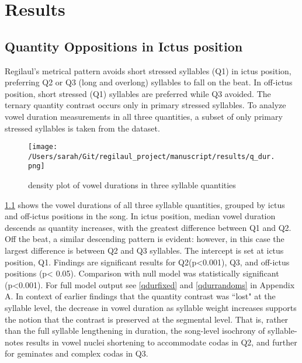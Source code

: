 \chapter{Results}
%

\section{Quantity Oppositions in Ictus position}

Regilaul's metrical pattern avoids short stressed syllables (Q1) in ictus position, preferring Q2 or Q3 (long and overlong) syllables to fall on the beat. In off-ictus position, short stressed (Q1) syllables are preferred while Q3 avoided.
The ternary quantity contrast occurs only in primary stressed syllables. To analyze vowel duration measurements in all three quantities, a subset of only primary stressed syllables is taken from the dataset. 



\begin{figure}[htb]
\centering
\texttt{[image: /Users/sarah/Git/regilaul\_project/manuscript/results/q\_dur.png]}
\caption{density plot of vowel durations in three syllable quantities}
\label{qdur}

\end{figure}
%


\ref{qdur} shows the vowel durations of all three syllable quantities, grouped by ictus and off-ictus positions in the song. In ictus position, median vowel duration descends as quantity increases, with the greatest difference between Q1 and Q2. Off the beat, a similar descending pattern is evident: however, in this case the largest difference is between Q2 and Q3 syllables. 
 The intercept is set at ictus position, Q1. Findings are significant results for Q2(p<0.001), Q3, and off-ictus positions (p< 0.05). Comparison with null model was statistically significant (p<0.001). For full model output see \ref{qdurfixed} and \ref{qdurrandoms} in Appendix A. In context of earlier findings that the quantity contrast was ``lost" at the syllable level, the decrease in vowel duration as syllable weight increases supports the notion that the contrast is preserved at the segmental level. That is, rather than the full syllable lengthening in duration, the song-level isochrony of syllable-notes results in vowel nuclei shortening to accommodate codas in Q2, and further for geminates and complex codas in Q3. 
 
